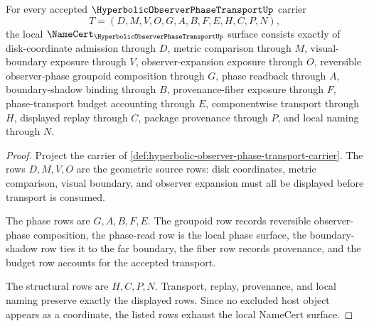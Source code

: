 \begin{theorem}
\label{thm:hyperbolic-observer-phase-transport-namecert-obligations}
For every accepted $\HyperbolicObserverPhaseTransportUp$ carrier
$$
T=(D,M,V,O,G,A,B,F,E,H,C,P,N),
$$
the local $\NameCert_{\HyperbolicObserverPhaseTransportUp}$ surface consists exactly of disk-coordinate admission through $D$, metric comparison through $M$, visual-boundary exposure through $V$, observer-expansion exposure through $O$, reversible observer-phase groupoid composition through $G$, phase readback through $A$, boundary-shadow binding through $B$, provenance-fiber exposure through $F$, phase-transport budget accounting through $E$, componentwise transport through $H$, displayed replay through $C$, package provenance through $P$, and local naming through $N$.
\end{theorem}
\begin{proof}
Project the carrier of \autoref{def:hyperbolic-observer-phase-transport-carrier}. The rows $D,M,V,O$ are the geometric source rows: disk coordinates, metric comparison, visual boundary, and observer expansion must all be displayed before transport is consumed.

The phase rows are $G,A,B,F,E$. The groupoid row records reversible observer-phase composition, the phase-read row is the local phase surface, the boundary-shadow row ties it to the far boundary, the fiber row records provenance, and the budget row accounts for the accepted transport.

The structural rows are $H,C,P,N$. Transport, replay, provenance, and local naming preserve exactly the displayed rows. Since no excluded host object appears as a coordinate, the listed rows exhaust the local NameCert surface.
\end{proof}

